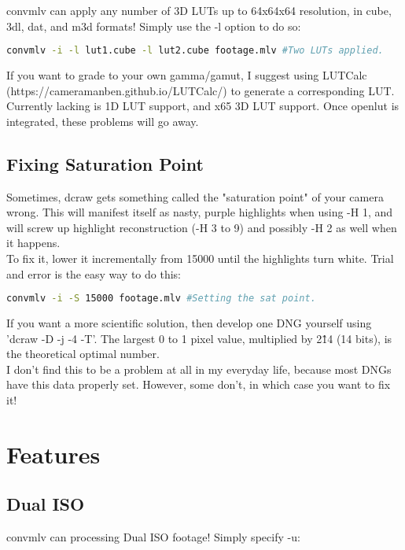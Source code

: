 \documentclass[a4paper,12pt]{article}
\begin{document}
		convmlv can apply any number of 3D LUTs up to 64x64x64 resolution, in cube, 3dl, dat, and m3d formats! Simply use the -l option to do so:
		
\begin{lstlisting}[language=bash]
	convmlv -i -l lut1.cube -l lut2.cube footage.mlv #Two LUTs applied.
\end{lstlisting}
		
		If you want to grade to your own gamma/gamut, I suggest using LUTCalc
		(https://cameramanben.github.io/LUTCalc/) to generate a corresponding LUT.\\
		
		Currently lacking is 1D LUT support, and x65 3D LUT support. Once openlut is integrated, these problems will go away.
		
	\subsection{Fixing Saturation Point}
		Sometimes, dcraw gets something called the "saturation point" of your camera wrong. This will manifest itself as nasty, purple highlights when using
		-H 1, and will screw up highlight reconstruction (-H 3 to 9) and possibly -H 2 as well when it happens.\\
		
		To fix it, lower it incrementally from 15000 until the highlights turn white. Trial and error is the easy way to do this:
		
\begin{lstlisting}[language=bash]
	convmlv -i -S 15000 footage.mlv #Setting the sat point.
\end{lstlisting}
		
		If you want a more scientific solution, then develop one DNG yourself using 'dcraw -D -j -4 -T'. The largest 0 to 1 pixel value, multiplied by 2\^14 (14 bits),
		is the  theoretical optimal number.\\
		
		I don't find this to be a problem at all in my everyday life, because most DNGs have this data properly set. However, some don't, in which case you want to fix it!
\section{Features}
	\subsection{Dual ISO}
		convmlv can processing Dual ISO footage! Simply specify -u:
\end{document}
